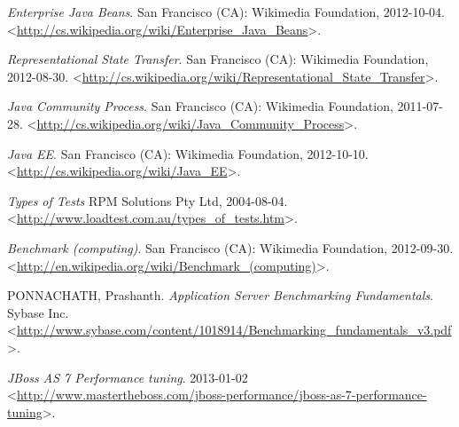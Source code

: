 \documentclass[122pt,oneside]{fithesis}
\begin{document}
\begin{thebibliography}{99}
\emph{Enterprise Java Beans}.
San Francisco (CA): Wikimedia Foundation, 2012-10-04.
\textless\href{http://cs.wikipedia.org/wiki/Enterprise\_Java\_Beans}{http://cs.wikipedia.org/wiki/Enterprise\_Java\_Beans}\textgreater.

\emph{Representational State Transfer}.
San Francisco (CA): Wikimedia Foundation, 2012-08-30.
\textless\href{http://cs.wikipedia.org/wiki/Representational\_State\_Transfer}{http://cs.wikipedia.org/wiki/Representational\_State\_Transfer}\textgreater.

\emph{Java Community Process}.
San Francisco (CA): Wikimedia Foundation, 2011-07-28.
\textless\href{http://cs.wikipedia.org/wiki/Java\_Community\_Process}{http://cs.wikipedia.org/wiki/Java\_Community\_Process}\textgreater.

\emph{Java EE}.
San Francisco (CA): Wikimedia Foundation, 2012-10-10.
\textless\href{http://cs.wikipedia.org/wiki/Java\_EE}{http://cs.wikipedia.org/wiki/Java\_EE}\textgreater.

\emph{Types of Tests}
RPM Solutions Pty Ltd, 2004-08-04.
\textless\href{http://www.loadtest.com.au/types\_of\_tests.htm}{http://www.loadtest.com.au/types\_of\_tests.htm}\textgreater.

\emph{Benchmark (computing)}.
San Francisco (CA): Wikimedia Foundation, 2012-09-30.
\textless\href{http://en.wikipedia.org/wiki/Benchmark\_(computing)}{http://en.wikipedia.org/wiki/Benchmark\_(computing)}\textgreater.

PONNACHATH, Prashanth.
\emph{Application Server Benchmarking Fundamentals}.
Sybase Inc.
\textless\href{http://www.sybase.com/content/1018914/Benchmarking\_fundamentals\_v3.pdf}{http://www.sybase.com/content/1018914/Benchmarking\_fundamentals\_v3.pdf}\textgreater.

\emph{JBoss AS 7 Performance tuning}.
2013-01-02
\textless\href{http://www.mastertheboss.com/jboss-performance/jboss-as-7-performance-tuning}{http://www.mastertheboss.com/jboss-performance/jboss-as-7-performance-tuning}\textgreater.


\end{thebibliography} %



\end{document}
